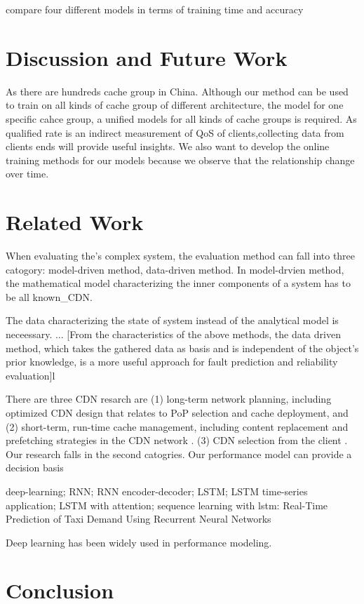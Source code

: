 \documentclass[5p]{elsarticle}
\begin{document}
compare four different models in terms of training time and accuracy 

\section{Discussion and Future Work}
As there are hundreds cache group in China. Although our method can be used to train on all kinds of cache group of different architecture, the model for one specific cahce group, a unified models for all kinds of cache groups is required. As qualified rate is an indirect measurement of QoS of clients,collecting data from clients ends will provide useful insights. We also want to develop the online training methods for our models because we observe that the relationship change over time.
\section{Related Work}
When evaluating the's complex system, the evaluation method can fall into three catogory: model-driven method, data-driven method. In model-drvien method, the mathematical model characterizing the inner 
components of a system has to be all known{\Rethinking_CDN}. 

The data characterizing the state of system instead of the analytical model is neceessary. \cite{Jiang2017Pytheas}.\cite{Mao2017NeuralPensieve}.\cite{c}. [From the characteristics of the above methods, the data driven method, which takes the gathered data
as basis and is independent of the object’s prior knowledge, is a more
useful approach for fault prediction and reliability evaluation]l

There are three CDN resarch are (1) long-term network planning, including optimized CDN design that relates to PoP selection and cache deployment, and (2) short-term, run-time cache management, including content replacement and prefetching strategies in the CDN network \cite{Rethinking_CDN}. (3) CDN selection from the client\cite{Jiang2017Pytheas:Exploration-Exploitation} \cite{CFA}. Our research falls in the second catogries. Our performance model can provide a decision basis

deep-learning; RNN; RNN encoder-decoder; LSTM; LSTM time-series application; LSTM with attention; sequence learning with lstm:
Real-Time Prediction of Taxi Demand Using Recurrent Neural Networks

Deep learning has been widely used in performance modeling. 

\section{Conclusion}
\end{document}
